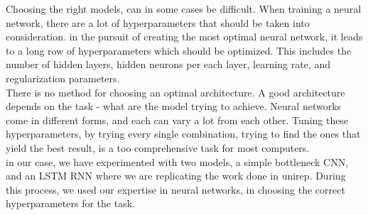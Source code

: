 Choosing the right models, can in some cases be difficult. When training a neural network, there are a lot of hyperparameters that should be taken into consideration. in the pursuit of creating the most optimal neural network, it leads to a long row of hyperparameters which should be optimized. This includes the number of hidden layers, hidden neurons per each layer, learning rate, and regularization parameters. \\

\noindent
There is no method for choosing an optimal architecture. A good architecture depends on the task - what are the model trying to achieve. Neural networks come in different forms, and each can vary a lot from each other. Tuning these hyperparameters, by trying every single combination, trying to find the ones that yield the best result, is a too comprehensive task for most computers. \\

\noindent
in our case, we have experimented with two models, a simple bottleneck CNN, and an LSTM RNN where we are replicating the work done in unirep\cite{unirep}. During this process, we used our expertise in neural networks, in choosing the correct hyperparameters for the task.
